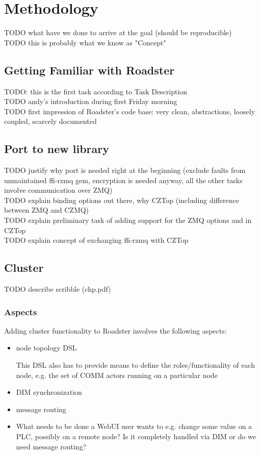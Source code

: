 \chapter{Methodology}
TODO what have we done to arrive at the goal (should be reproducible)\\
TODO this is probably what we know as "Concept"\\


\section{Getting Familiar with Roadster}
TODO: this is the first task according to Task Description\\
TODO andy's introduction during first Friday morning\\
TODO first impression of Roadster's code base: very clean, abstractions, loosely coupled, scarcely documented


\section{Port to new \zmq library}\label{sec:meth:port}
TODO justify why port is needed right at the beginning (exclude faults from unmaintained ffi-rzmq gem, encryption is needed anyway, all the other tasks involve communication over ZMQ)\\
TODO explain binding options out there, why CZTop (including difference between ZMQ and CZMQ)\\
TODO explain preliminary task of adding support for the ZMQ options  and  in CZTop\\
TODO explain concept of exchanging ffi-rzmq with CZTop\\


\section{Cluster}\label{sec:meth:cluster}
TODO describe scribble (chp.pdf)


\subsection{Aspects}
Adding cluster functionality to Roadster involves the following aspects:
\begin{itemize}
	\item node topology DSL

		This DSL also has to provide means to define the roles/functionality of each node, e.g. the set of COMM actors running on a particular node

	\item DIM synchronization
	\item message routing
	\item What needs to be done a WebUI user wants to e.g. change some value on a PLC, possibly on a remote node? Is it completely handled via DIM or do we need message routing?
\end{itemize}




